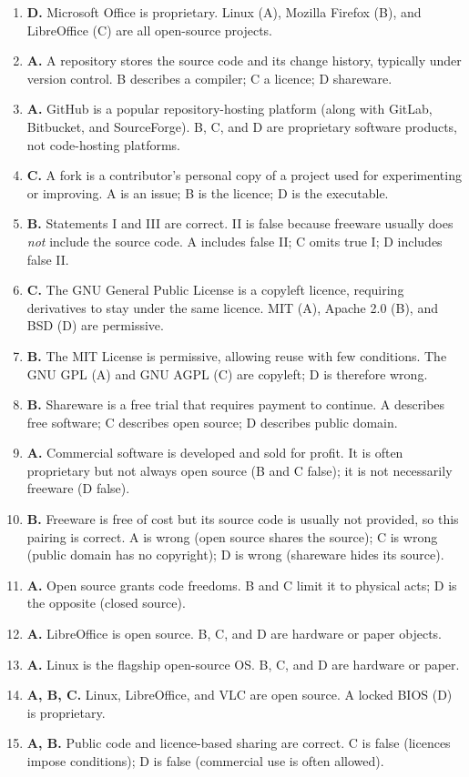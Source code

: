\documentclass[11pt]{article}
\begin{document}
\begin{enumerate}[label=\textbf{Q\arabic*.}, leftmargin=*]
  without restriction. A describes open source; C describes shareware; D
  describes proprietary software.
\item \textbf{D.} Microsoft Office is proprietary. Linux (A), Mozilla Firefox
  (B), and LibreOffice (C) are all open-source projects.
\item \textbf{A.} A repository stores the source code and its change history,
  typically under version control. B describes a compiler; C a licence; D
  shareware.
\item \textbf{A.} GitHub is a popular repository-hosting platform (along with
  GitLab, Bitbucket, and SourceForge). B, C, and D are proprietary software
  products, not code-hosting platforms.
\item \textbf{C.} A fork is a contributor's personal copy of a project used
  for experimenting or improving. A is an issue; B is the licence; D is the
  executable.
\item \textbf{B.} Statements I and III are correct. II is false because
  freeware usually does \emph{not} include the source code. A includes false
  II; C omits true I; D includes false II.
\item \textbf{C.} The GNU General Public License is a copyleft licence,
  requiring derivatives to stay under the same licence. MIT (A), Apache 2.0
  (B), and BSD (D) are permissive.
\item \textbf{B.} The MIT License is permissive, allowing reuse with few
  conditions. The GNU GPL (A) and GNU AGPL (C) are copyleft; D is therefore
  wrong.
\item \textbf{B.} Shareware is a free trial that requires payment to continue.
  A describes free software; C describes open source; D describes public
  domain.
\item \textbf{A.} Commercial software is developed and sold for profit. It is
  often proprietary but not always open source (B and C false); it is not
  necessarily freeware (D false).
\item \textbf{B.} Freeware is free of cost but its source code is usually not
  provided, so this pairing is correct. A is wrong (open source shares the
  source); C is wrong (public domain has no copyright); D is wrong (shareware
  hides its source).

\item \textbf{A.} Open source grants code freedoms. B and C limit it to physical acts; D is the opposite (closed source).
\item \textbf{A.} LibreOffice is open source. B, C, and D are hardware or paper objects.
\item \textbf{A.} Linux is the flagship open-source OS. B, C, and D are hardware or paper.
\item \textbf{A, B, C.} Linux, LibreOffice, and VLC are open source. A locked BIOS (D) is proprietary.
\item \textbf{A, B.} Public code and licence-based sharing are correct. C is false (licences impose conditions); D is false (commercial use is often allowed).
\end{enumerate}
\def\JKSSBLessonID{45}\def\JKSSBAnswers{1}
\end{document}
